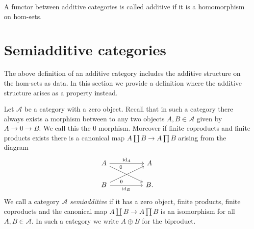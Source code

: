 \documentclass{memoir}
\begin{document}
A functor between additive categories is called additive if it is a homomorphism on hom-sets.
\section{Semiadditive categories}
The above definition of an additive category includes the additive structure on the hom-sets as data. 
In this section we provide a definition where the additive structure arises as a property instead.

Let $\mathcal A$ be a category with a zero object.
Recall that in such a category there always exists a morphism between to any two objects $A,B\in\mathcal A$ given by $A\to 0 \to B$. We call this the $0$ morphism.
Moreover if finite coproducts and finite products exists there is a canonical map $A\coprod B\to A\prod B$ arising from the diagram
\begin{equation}
    \begin{tikzcd}[column sep = huge]
        A \arrow[r,"\id_A"] \arrow[dr,near start,"0"] & A \\
        B \arrow[r,swap,"\id_B"] \arrow[ur,near start,swap,"0"] & B.
    \end{tikzcd}
\end{equation}
We call a category $\mathcal A$ \textit{semiadditive} if it has a zero object, finite products, finite coproducts and the canonical map $A\coprod B\to A\prod B$ is an isomorphism for all $A,B\in \mathcal A$.
In such a category we write $A\oplus B$ for the biproduct.
\end{document}

